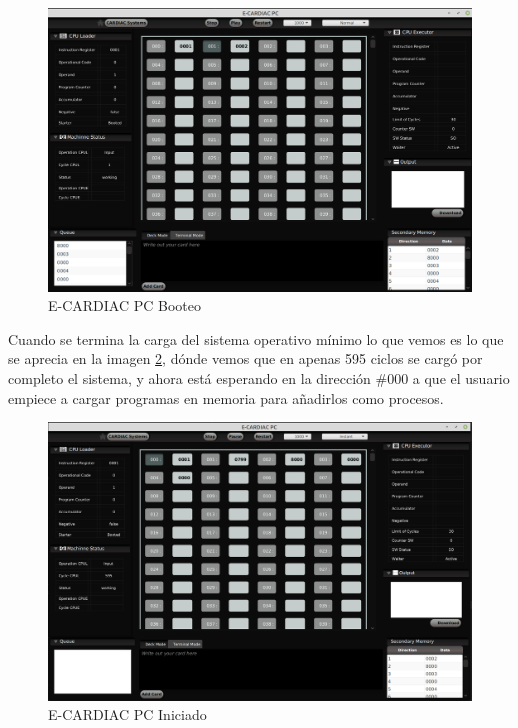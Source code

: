 \documentclass[letterpaper,12pt,oneside]{book}
\begin{document}
			
			\begin{figure}[H]		
				\centering
				\includegraphics[scale=0.35]{media/Paralela/ecardiacpc_booteo.png}
				\caption{ E-CARDIAC PC Booteo}
				\label{fig:ecardiacpc_booteo}
			\end{figure}	
			
			
			Cuando se termina la carga del sistema operativo mínimo lo que vemos es lo que se aprecia en la imagen \ref{fig:ecardiacpc_booteado}, dónde
			vemos que en apenas 595 ciclos se cargó por completo el sistema, y ahora está esperando en la dirección \#000 a que el usuario empiece
			a cargar programas en memoria para añadirlos como procesos.

			\begin{figure}[H]		
				\centering
				\includegraphics[scale=0.35]{media/Paralela/ecardiacpc_booteado.png}
				\caption{ E-CARDIAC PC Iniciado}
				\label{fig:ecardiacpc_booteado}
			\end{figure}	
\end{document}
